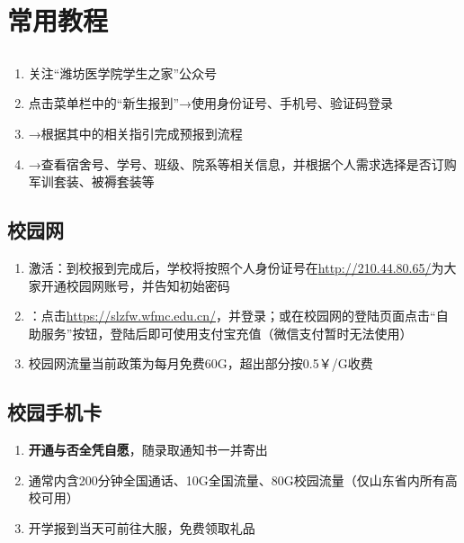 \chapter[常用教程]{常用教程}

\section[新生信息查询]{}
\label{freshman_query}
\begin{enumerate}
    \item 关注“潍坊医学院学生之家”公众号
    \item 点击菜单栏中的“新生报到”→使用身份证号、手机号、验证码登录
    \item →根据其中的相关指引完成预报到流程
    \item →查看宿舍号、学号、班级、院系等相关信息，并根据个人需求选择是否订购军训套装、被褥套装等
\end{enumerate}

\section[校园网]{校园网}
\begin{enumerate}
    \item 激活：到校报到完成后，学校将按照个人身份证号在\uline{\href{http://210.44.80.65/}{http://210.44.80.65/}}为大家开通校园网账号，并告知初始密码\footnotemark
    \item \textbf{}：点击\uline{\href{https://slzfw.wfmc.edu.cn/}{https://slzfw.wfmc.edu.cn/}}，并登录；或在校园网的登陆页面点击“自助服务”按钮\footnotemark，登陆后即可使用支付宝充值（微信支付暂时无法使用）
    \item 校园网流量当前政策为每月免费60G，超出部分按0.5￥/G收费
\end{enumerate}

\section[校园手机卡]{校园手机卡}
\begin{enumerate}
    \item \textbf{开通与否全凭自愿}，随录取通知书一并寄出
    \item 通常内含200分钟全国通话、10G全国流量、80G校园流量（仅山东省内所有高校可用）
    \item 开学报到当天可前往大服，免费领取礼品
\end{enumerate}

